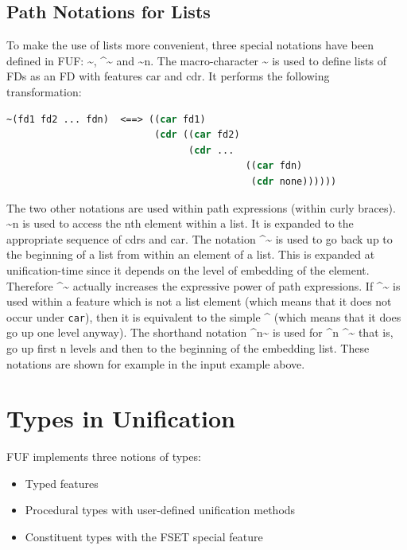 \documentclass[10pt,a4paper]{report}
\begin{document}
\section{Path Notations for Lists}

To make the use of lists more convenient, three special notations have been
defined in FUF: \~{}, \^{}\~{} and \~{}n.  The macro-character \~{} is used to define
lists of FDs as an FD with features car and cdr.  It performs the following
transformation:

\begin{lstlisting}[language=Lisp]
~(fd1 fd2 ... fdn)  <==> ((car fd1)
                          (cdr ((car fd2)
                                (cdr ...
                                          ((car fdn)
                                           (cdr none))))))
\end{lstlisting}


The two other notations are used within path expressions (within curly
braces).  \~{}n is used to access the nth element within a list.  It is
expanded to the appropriate sequence of cdrs and car.  The notation \^{}\~{} is
used to go back up to the beginning of a list from within an element of a
list.  This is expanded at unification-time since it depends on the level
of embedding of the element.  Therefore \^{}\~{} actually increases the
expressive power of path expressions.  If \^{}\~{} is used within a feature which
is not a list element (which means that it does not occur under {\tt car}),
then it is equivalent to the simple \^{} (which means that it does go up one
level anyway).   The shorthand notation \^{}n\~{} is used for \^{}n \^{}\~{} that is, go
up first n levels and then to the beginning of the embedding list.  These
notations are shown for example in the input example above.


\chapter{Types in Unification}

FUF implements three notions of types:
\begin{itemize}
\item Typed features

\item Procedural types with user-defined unification methods

\item Constituent types with the \textsc{FSET} special feature 
\end{itemize}
\end{document}
